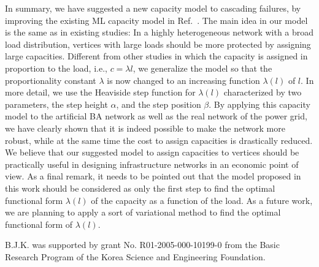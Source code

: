 \documentclass[doublecol]{epl2}
\begin{document}
In summary, we have suggested a new capacity model to cascading
failures, by improving the existing ML capacity model in
Ref.~\cite{CasModel}. The main idea in our model is the same as in
existing studies: In a highly heterogeneous network with a broad
load distribution, vertices with large loads should be more
protected by assigning large capacities. Different from other
studies in which the capacity is assigned in proportion to the load,
i.e., $c = \lambda  l$, we generalize the model so that the
proportionality constant $\lambda$ is now changed to an increasing
function $\lambda(l)$ of $l$. In more detail, we use the Heaviside
step function for $\lambda(l)$ characterized by two parameters, the
step height $\alpha$, and the step position $\beta$. By applying
this capacity model to the artificial BA network as well as the real
network of the power grid, we have clearly shown that it is indeed
possible to make the network more robust, while at the same time the
cost to assign capacities is drastically reduced. We believe that
our suggested model to assign capacities to vertices should be
practically useful in designing infrastructure networks in an
economic point of view. 
As a final remark, it needs to be
pointed out that the model proposed in this work should be
considered as only the first step to find the optimal functional
form $\lambda(l)$ of the capacity as a function of the load. As a
future work, we are planning to apply a sort of variational method
to find the optimal functional form of  $\lambda(l)$.

B.J.K. was supported by grant No. R01-2005-000-10199-0 from the
Basic Research Program of the Korea Science and Engineering
Foundation.
\end{document}
